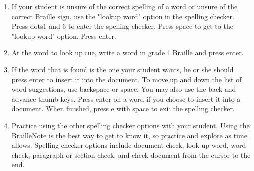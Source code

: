 \documentclass[10pt,letterpaper,twoside]{report}
\begin{document}
{{{{\begin{enumerate}
	      \begin{enumerate}
		      \item Use i to ignore all occurrences of the word.
		            
		      \item Space with dot5 will fix only the occurrence of the word that your student is currently working with.
		            
		      \item The letter a will add the word to the spelling dictionary.
		            
		      \item The letter c will help correct the word.
		            
		      \item To look up a word, press l.
		            
		      \item For suggestions, press s.
		            
		      \item Practice checking words at this time until you and your student adjust to using the word check option.
		            
		            
	      \end{enumerate}
	\item If your student is unsure of the correct spelling of a word or unsure of the correct Braille sign, use the "lookup word" option in the spelling checker.  Press dots1 and 6 to enter the spelling checker.  Press space to get to the "lookup word" option.  Press enter.
	      
	\item At the word to look up cue, write a word in grade 1 Braille and press enter.
	      
	\item If the word that is found is the one your student wants, he or she should press enter to insert it into the document.  To move up and down the list of word suggestions, use backspace or space.  You may also use the back and advance thumb-keys.  Press enter on a word if you choose to insert it into a document.  When finished, press e with space to exit the spelling checker.
	      
	\item Practice using the other spelling checker options with your student.  Using the BrailleNote is the best way to get to know it, so practice and explore as time allows.  Spelling checker options include document check, look up word, word check, paragraph or section check, and check document from the cursor to the end.
	      

\end{enumerate}}}}}
\end{document}
